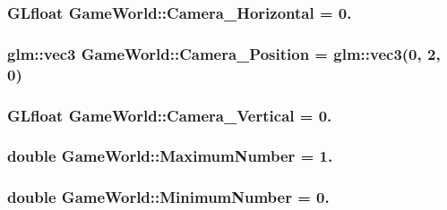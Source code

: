 \subsubsection[{Camera\+\_\+\+Horizontal}]{\setlength{\rightskip}{0pt plus 5cm}G\+Lfloat Game\+World\+::\+Camera\+\_\+\+Horizontal = 0.}\label{classGameWorld_a7f4911dda9b3b4e4eb03ece87e16cd96}
\hypertarget{classGameWorld_ad80e597474ea4c52a583e81788187571}{}
\subsubsection[{Camera\+\_\+\+Position}]{\setlength{\rightskip}{0pt plus 5cm}glm\+::vec3 Game\+World\+::\+Camera\+\_\+\+Position = glm\+::vec3(0, 2, 0)}\label{classGameWorld_ad80e597474ea4c52a583e81788187571}
\hypertarget{classGameWorld_a26658e739c4d267b1be35ed820089931}{}
\subsubsection[{Camera\+\_\+\+Vertical}]{\setlength{\rightskip}{0pt plus 5cm}G\+Lfloat Game\+World\+::\+Camera\+\_\+\+Vertical = 0.}\label{classGameWorld_a26658e739c4d267b1be35ed820089931}
\hypertarget{classGameWorld_a1cddcf233625a98581eaeb9fd7c8c574}{}
\subsubsection[{Maximum\+Number}]{\setlength{\rightskip}{0pt plus 5cm}double Game\+World\+::\+Maximum\+Number = 1.}\label{classGameWorld_a1cddcf233625a98581eaeb9fd7c8c574}
\hypertarget{classGameWorld_a54ccf4cf03172ab8779e9c326c8846ed}{}
\subsubsection[{Minimum\+Number}]{\setlength{\rightskip}{0pt plus 5cm}double Game\+World\+::\+Minimum\+Number = 0.}\label{classGameWorld_a54ccf4cf03172ab8779e9c326c8846ed}
\hypertarget{classGameWorld_a9bf4eb977e6ab9299aaef1345c4fa4dd}{}
